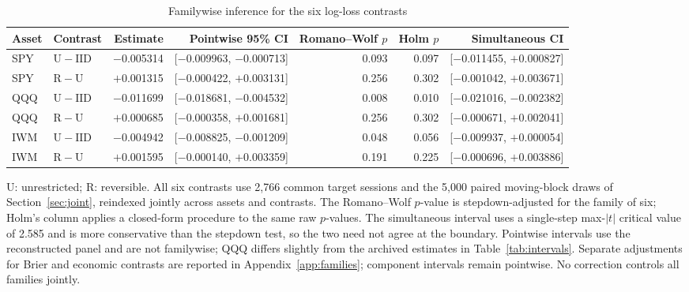 \begin{table}[!htbp]\centering\small\setlength{\tabcolsep}{5pt}
\caption{Familywise inference for the six log-loss contrasts}\label{tab:joint}
\footnotesize\begin{tabular}{llrrrrr}\toprule
Asset & Contrast & Estimate & Pointwise 95\% CI & Romano--Wolf $p$ & Holm $p$ & Simultaneous CI\\\midrule
SPY & $\mathrm{U}-\mathrm{IID}$ & $-$0.005314 & [$-$0.009963, $-$0.000713] & 0.093 & 0.097 & [$-$0.011455, $+$0.000827]\\
SPY & $\mathrm{R}-\mathrm{U}$ & $+$0.001315 & [$-$0.000422, $+$0.003131] & 0.256 & 0.302 & [$-$0.001042, $+$0.003671]\\
QQQ & $\mathrm{U}-\mathrm{IID}$ & $-$0.011699 & [$-$0.018681, $-$0.004532] & 0.008 & 0.010 & [$-$0.021016, $-$0.002382]\\
QQQ & $\mathrm{R}-\mathrm{U}$ & $+$0.000685 & [$-$0.000358, $+$0.001681] & 0.256 & 0.302 & [$-$0.000671, $+$0.002041]\\
IWM & $\mathrm{U}-\mathrm{IID}$ & $-$0.004942 & [$-$0.008825, $-$0.001209] & 0.048 & 0.056 & [$-$0.009937, $+$0.000054]\\
IWM & $\mathrm{R}-\mathrm{U}$ & $+$0.001595 & [$-$0.000140, $+$0.003359] & 0.191 & 0.225 & [$-$0.000696, $+$0.003886]\\
\bottomrule\end{tabular}
\par\smallskip\parbox{0.98\linewidth}{\footnotesize U: unrestricted; R: reversible. All six contrasts use 2,766 common target sessions and the 5,000 paired moving-block draws of Section~\ref{sec:joint}, reindexed jointly across assets and contrasts. The Romano--Wolf $p$-value is stepdown-adjusted for the family of six; Holm's column applies a closed-form procedure to the same raw $p$-values. The simultaneous interval uses a single-step max-$|t|$ critical value of 2.585 and is more conservative than the stepdown test, so the two need not agree at the boundary. Pointwise intervals use the reconstructed panel and are not familywise; QQQ differs slightly from the archived estimates in Table~\ref{tab:intervals}. Separate adjustments for Brier and economic contrasts are reported in Appendix~\ref{app:families}; component intervals remain pointwise. No correction controls all families jointly.}
\end{table}
